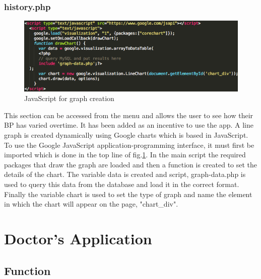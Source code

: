\documentclass[11pt]{article}
\begin{document}

\subsubsection{history.php}
 
\begin{figure}
\centering 
\includegraphics[width=0.95\linewidth]{historyJS.png}
\caption{JavaScript for graph creation \label{historyJS}}
\endminipage\hfill
\end{figure} 
This section can be accessed from the menu and allows the user to see how their BP has varied overtime. It has been added as an incentive to use the app. A line graph is created dynamically using Google charts \cite{chart} which is based in JavaScript. To use the Google JavaScript application-programming interface, it must first be imported which is done in the top line of fig.\ref{historyJS}. In the main script the required packages that draw the graph are loaded and then a function is created to set the details of the chart. The variable data is created and script, graph-data.php is used to query this data from the database and load it in the correct format. Finally the variable chart is used to set the type of graph and name the element in which the chart will appear on the page, "chart\_div". 


\section{Doctor's Application}

\subsection{Function}
\end{document}
